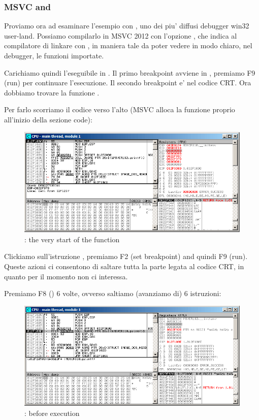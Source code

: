 \ifdefined\IncludeOlly
\clearpage
\subsubsection{MSVC and \olly}
\myindex{\olly}

Proviamo ora ad esaminare l'esempio con \olly, uno dei piu' diffusi debugger win32 user-land.
Possiamo compilarlo in MSVC 2012 con l'opzione , che indica al compilatore di linkare con ,
in maniera tale da poter vedere in modo chiaro, nel debugger, le funzioni importate.

Carichiamo quindi l'eseguibile in \olly.
Il primo breakpoint avviene in , premiamo F9 (run) per continuare l'esecuzione. 
Il secondo breakpoint e' nel codice \ac{CRT}.
Ora dobbiamo trovare la funzione \main.

Per farlo scorriamo il codice verso l'alto (MSVC alloca la funzione \main proprio all'inizio della sezione code): 
\begin{figure}[H]
\centering
\includegraphics[scale=\FigScale]{patterns/03_printf/x86/olly3_1.png}
\caption{\olly: the very start of the \main function}
\label{fig:printf3_olly_1}
\end{figure}

Clickiamo sull'istruzione , premiamo F2 (set breakpoint) and quindi F9 (run).
Queste azioni ci consentono di saltare tutta la parte legata al codice \ac{CRT}, in quanto per il momento non ci interessa.

\clearpage
Premiamo F8 (\stepover) 6 volte, ovverso saltiamo (avanziamo di) 6 istruzioni:

\begin{figure}[H]
\centering
\includegraphics[scale=\FigScale]{patterns/03_printf/x86/olly3_2.png}
\caption{\olly: before \printf execution}
\label{fig:printf3_olly_2}
\end{figure}

